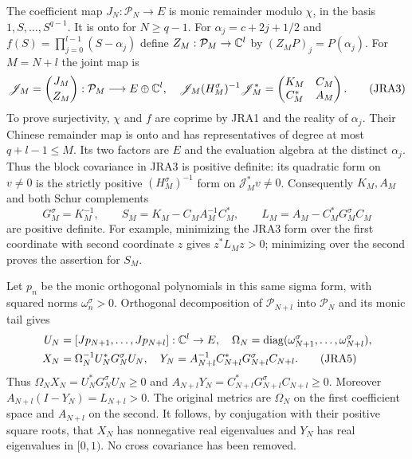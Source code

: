 The coefficient map $J_N:\mathcal P_N\to E$ is monic remainder modulo $\chi$,
in the basis $1,S,\ldots,S^{q-1}$. It is onto for $N\geq q-1$.
For $\alpha_j=c+2j+1/2$ and $f(S)=\prod_{j=0}^{l-1}(S-\alpha_j)$ define
$Z_M:\mathcal P_M\to\mathbb C^l$ by $(Z_MP)_j=P(\alpha_j)$.
For $M=N+l$ the joint map is
\begin{equation}
 \mathscr J_M=\binom{J_M}{Z_M}:\mathcal P_M\longrightarrow E\oplus\mathbb C^l,
 \quad
 \mathscr J_M(H_M^\sigma)^{-1}\mathscr J_M^*
 =\begin{pmatrix}K_M&C_M\\C_M^*&A_M\end{pmatrix}.
 \tag{JRA3}
\end{equation}
To prove surjectivity, $\chi$ and $f$ are coprime by JRA1 and the reality
of $\alpha_j$. Their Chinese remainder map is onto and has representatives
of degree at most $q+l-1\leq M$. Its two factors are $E$ and the evaluation
algebra at the distinct $\alpha_j$. Thus the block covariance in JRA3 is
positive definite: its quadratic form on $v\ne0$ is the strictly positive
$(H_M^\sigma)^{-1}$ form on $\mathscr J_M^*v\ne0$.
Consequently $K_M,A_M$ and both Schur complements
\begin{equation}
 G_M^\sigma=K_M^{-1},\qquad
 S_M=K_M-C_M A_M^{-1}C_M^*,\qquad
 L_M=A_M-C_M^*G_M^\sigma C_M
 \tag{JRA4}
\end{equation}
are positive definite. For example, minimizing the JRA3 form over the
first coordinate with second coordinate $z$ gives $z^*L_Mz>0$;
minimizing over the second proves the assertion for $S_M$.

Let $p_n$ be the monic orthogonal polynomials in this same sigma form,
with squared norms $\omega_n^\sigma>0$. Orthogonal decomposition of
$\mathcal P_{N+l}$ into $\mathcal P_N$ and its monic tail gives
\begin{align}
 U_N&=[Jp_{N+1},\ldots,Jp_{N+l}]:\mathbb C^l\to E,\quad
 \Omega_N=\operatorname{diag}(\omega_{N+1}^\sigma,\ldots,\omega_{N+l}^\sigma),\notag\\
 X_N&=\Omega_N^{-1}U_N^*G_N^\sigma U_N,\quad
 Y_N=A_{N+l}^{-1}C_{N+l}^*G_{N+l}^\sigma C_{N+l}.
 \tag{JRA5}
\end{align}
Thus $\Omega_NX_N=U_N^*G_N^\sigma U_N\geq0$ and
$A_{N+l}Y_N=C_{N+l}^*G_{N+l}^\sigma C_{N+l}\geq0$.
Moreover $A_{N+l}(I-Y_N)=L_{N+l}>0$.
The original metrics are $\Omega_N$ on the first coefficient space and
$A_{N+l}$ on the second. It follows, by conjugation with their positive
square roots, that $X_N$ has nonnegative real eigenvalues and $Y_N$ has
real eigenvalues in $[0,1)$. No cross covariance has been removed.

